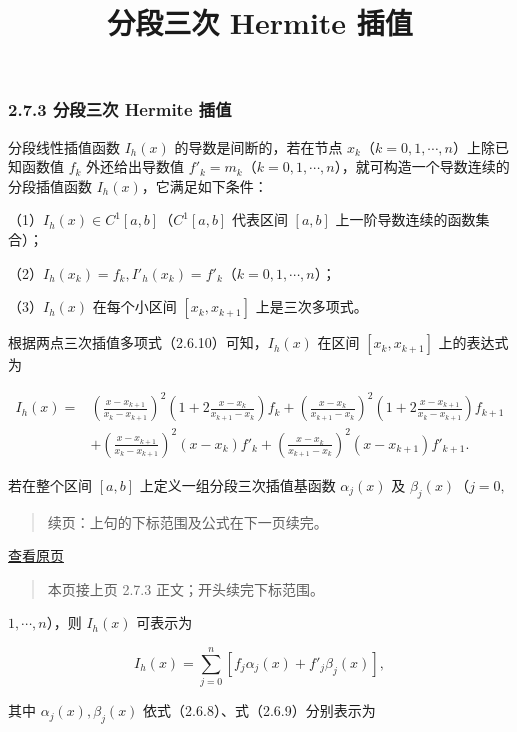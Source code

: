 \documentclass[
  10pt,
  fontset=fandol]{ctexart}
\title{分段三次 Hermite 插值}
\author{}
\date{}
\begin{document}
\maketitle

\subsubsection{2.7.3 分段三次 Hermite 插值}\label{ux5206ux6bb5ux4e09ux6b21-hermite-ux63d2ux503c}

分段线性插值函数 \(I_h(x)\) 的导数是间断的，若在节点 \(x_k\)（\(k=0,1,\cdots,n\)）上除已知函数值 \(f_k\) 外还给出导数值 \(f'_k=m_k\)（\(k=0,1,\cdots,n\)），就可构造一个导数连续的分段插值函数 \(I_h(x)\)，它满足如下条件：

（1）\(I_h(x)\in C^1[a,b]\)（\(C^1[a,b]\) 代表区间 \([a,b]\) 上一阶导数连续的函数集合）；

（2）\(I_h(x_k)=f_k,I'_h(x_k)=f'_k\)（\(k=0,1,\cdots,n\)）；

（3）\(I_h(x)\) 在每个小区间 \([x_k,x_{k+1}]\) 上是三次多项式。

根据两点三次插值多项式（2.6.10）可知，\(I_h(x)\) 在区间 \([x_k,x_{k+1}]\) 上的表达式为

\[\begin{aligned}
I_h(x)={}&\left(\frac{x-x_{k+1}}{x_k-x_{k+1}}\right)^2\left(1+2\frac{x-x_k}{x_{k+1}-x_k}\right)f_k+\left(\frac{x-x_k}{x_{k+1}-x_k}\right)^2\left(1+2\frac{x-x_{k+1}}{x_k-x_{k+1}}\right)f_{k+1}\\
&+\left(\frac{x-x_{k+1}}{x_k-x_{k+1}}\right)^2(x-x_k)f'_k+\left(\frac{x-x_k}{x_{k+1}-x_k}\right)^2(x-x_{k+1})f'_{k+1}.
\end{aligned}\tag{2.7.5}\]

若在整个区间 \([a,b]\) 上定义一组分段三次插值基函数 \(\alpha_j(x)\) 及 \(\beta_j(x)\)（\(j=0,\)

\begin{quote}
续页：上句的下标范围及公式在下一页续完。
\end{quote}

\href{../../source-images/pdf-048.jpeg}{查看原页}

\begin{quote}
本页接上页 2.7.3 正文；开头续完下标范围。
\end{quote}

\(1,\cdots,n\)），则 \(I_h(x)\) 可表示为

\[I_h(x)=\sum_{j=0}^n[f_j\alpha_j(x)+f'_j\beta_j(x)],\tag{2.7.6}\]

其中 \(\alpha_j(x),\beta_j(x)\) 依式（2.6.8）、式（2.6.9）分别表示为
\end{document}
